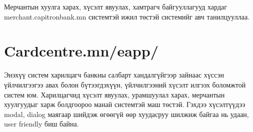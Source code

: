 Мерчантын хуулга харах, хүсэлт явуулах, хамтрагч байгууллагууд хардаг merchant.capitronbank.mn системтэй ижил төстэй системийг авч танилцууллаа.

    
    
\section{Cardcentre.mn/eapp/}
Энэхүү систем харилцагч банкны салбарт хандалгүйгээр зайнаас хүссэн үйлчилгээгээ авах болон бүтээгдэхүүн, үйлчилгээний хүсэлт илгээх боломжтой систем юм.
Харилцагчид хүсэлт явуулах, урамшуулал харах, мерчантын хуулгуудыг харж болдгоороо манай системтэй маш төстэй. Гэхдээ хүсэлтүүдээ modal, dialog маягаар шийдэж өгөөгүй өөр хуудасруу шилжиж байгаа нь удаан, user friendly биш байна.
